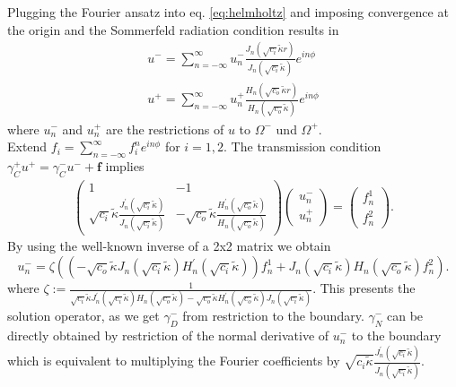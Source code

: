 \documentclass[10pt,journal,compsoc, onecolumn]{IEEEtran}
\begin{document}
Plugging the Fourier ansatz into eq. \ref{eq:helmholtz} and imposing convergence at the origin and 
the Sommerfeld radiation condition results in
\begin{align}
    u^- = \sum\limits_{n = -\infty}^\infty u_n^- \frac{J_n(\sqrt{ c_i} \tilde \kappa r)}{J_n(\sqrt{ c_i} \tilde \kappa)} e^{i n \phi} \nonumber \\
    u^+ = \sum\limits_{n = -\infty}^\infty u_n^+ \frac{H_n(\sqrt{ c_o} \tilde \kappa r)}{H_n(\sqrt{ c_o} \tilde \kappa)} e^{i n \phi} \nonumber
\end{align}
where $u_n^-$ and $u_n^+$ are the restrictions of $u$ to $\Omega^-$ und $\Omega^+$.\\
Extend $f_i = \sum\limits_{n = -\infty}^\infty f_i^n e^{in\phi}$ for $i=1,2$. The transmission condition $\gamma_{C}^{+} u^{+}=\gamma_{C}^{-} u^{-}+\mathbf{f}$ implies 
\begin{align}
    \begin{pmatrix}
        1 & -1 \\
        \sqrt{c_i} \tilde \kappa \frac{J_n^\prime(\sqrt{c_i} \tilde \kappa)}{J_n(\sqrt{c_i} \tilde \kappa)} & 
        -  \sqrt{c_o} \tilde \kappa \frac{H_n^\prime(\sqrt{c_o} \tilde \kappa)}{H_n(\sqrt{c_o} \tilde \kappa)}
    \end{pmatrix} 
    \begin{pmatrix}
        u_n^- \\u_n^+
    \end{pmatrix}
    = 
    \begin{pmatrix}
        f_n^1 \\ f_n^2
    \end{pmatrix}.
\end{align} 
By using the well-known inverse of a 2x2 matrix we obtain 
\begin{equation}
    u_n^- = \zeta((-\sqrt{c_o}\tilde \kappa J_n(\sqrt{c_i} \tilde \kappa) H_n^\prime(\sqrt{c_i} \tilde \kappa))f_n^1 
    + J_n(\sqrt{c_i} \tilde \kappa) H_n(\sqrt{c_o} \tilde \kappa) f_n^2).
\end{equation}
where $\zeta := \frac{1}{\sqrt{c_i} \tilde \kappa J_n^\prime(\sqrt{c_i} \tilde \kappa) H_n(\sqrt{c_o} \tilde \kappa)
-\sqrt{c_o} \tilde \kappa H_n^\prime(\sqrt{c_o}\tilde \kappa) J_n(\sqrt{c_i} \tilde \kappa)
}$.
This presents the solution operator, as we get $\gamma_D^-$ from restriction to the boundary.
$\gamma_N^-$ can be directly obtained by restriction of the normal derivative of $u_n^-$ to the boundary 
which is equivalent to multiplying the Fourier coefficients by $\sqrt{c_i \tilde \kappa}\frac{J_n^\prime(\sqrt{c_i}\tilde \kappa)}{J_n(\sqrt{c_i}\tilde \kappa)}$.
\end{document}
